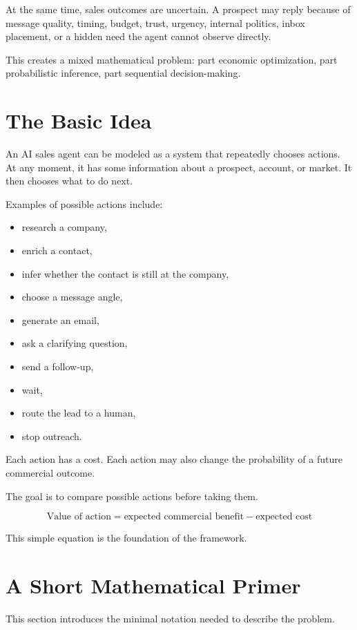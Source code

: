 \documentclass[12pt]{article}
\begin{document}
At the same time, sales outcomes are uncertain. A prospect may reply because of
message quality, timing, budget, trust, urgency, internal politics, inbox
placement, or a hidden need the agent cannot observe directly.

This creates a mixed mathematical problem: part economic optimization, part
probabilistic inference, part sequential decision-making.

\section{The Basic Idea}

An AI sales agent can be modeled as a system that repeatedly chooses actions.
At any moment, it has some information about a prospect, account, or market. It
then chooses what to do next.

Examples of possible actions include:

\begin{itemize}
    \item research a company,
    \item enrich a contact,
    \item infer whether the contact is still at the company,
    \item choose a message angle,
    \item generate an email,
    \item ask a clarifying question,
    \item send a follow-up,
    \item wait,
    \item route the lead to a human,
    \item stop outreach.
\end{itemize}

Each action has a cost. Each action may also change the probability of a future
commercial outcome.

The goal is to compare possible actions before taking them.

\[
\text{Value of action}
=
\text{expected commercial benefit}
-
\text{expected cost}
\]

This simple equation is the foundation of the framework.

\section{A Short Mathematical Primer}

This section introduces the minimal notation needed to describe the problem.
\end{document}
